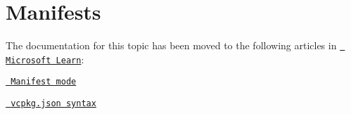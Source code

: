 \chapter{Manifests}
\hypertarget{md_external_2reflect-cpp_2vcpkg_2docs_2users_2manifests}{}\label{md_external_2reflect-cpp_2vcpkg_2docs_2users_2manifests}
\label{md_external_2reflect-cpp_2vcpkg_2docs_2users_2manifests_autotoc_md759}%
%


The documentation for this topic has been moved to the following articles in \href{https://learn.microsoft.com/vcpkg}{\texttt{ Microsoft Learn}}\+:


\begin{DoxyItemize}
\item \href{https://learn.microsoft.com/vcpkg/users/manifests}{\texttt{ Manifest mode}}
\item \href{https://learn.microsoft.com/vcpkg/reference/vcpkg-json}{\texttt{ vcpkg.\+json syntax}} 
\end{DoxyItemize}